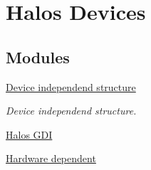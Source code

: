 \hypertarget{group___d_e_v_i_c_e}{
\section{Halos Devices}
\label{group___d_e_v_i_c_e}
}
\subsection*{Modules}
\begin{CompactItemize}
\item 
\hyperlink{group__device__driver}{Device independend structure}
\begin{CompactList}\small\item\em Device independend structure. \item\end{CompactList}

\item 
\hyperlink{group___g_d_i___d_e_v_i_c_e}{Halos GDI}
\item 
\hyperlink{group___d_e_v_i_c_e___p_o_r_t_s}{Hardware dependent}
\end{CompactItemize}
